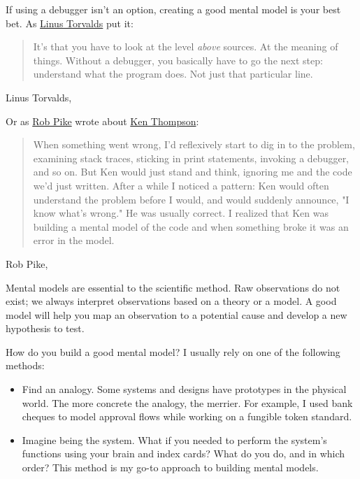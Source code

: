 \documentclass{article}
\begin{document}
If using a debugger isn't an option, creating a good mental model is your best bet.
As \href{https://en.wikipedia.org/wiki/Linus_Torvalds}{Linus Torvalds} put it:
\blockquote{
  It's that you have to look at the level \emph{above} sources.
  At the meaning of things.
  Without a debugger, you basically have to go the next step: understand what the program does.
  Not just that particular line.
}{Linus Torvalds, \href{https://lkml.org/lkml/2000/9/6/65}{\cite{Re: Availability of kdb}}}

Or as \href{https://en.wikipedia.org/wiki/Rob_Pike}{Rob Pike} wrote about \href{https://en.wikipedia.org/wiki/Ken_Thompson}{Ken Thompson}:

\blockquote{
  When something went wrong, I'd reflexively start to dig in to the problem, examining stack traces, sticking in print statements, invoking a debugger, and so on.
  But Ken would just stand and think, ignoring me and the code we'd just written.
  After a while I noticed a pattern: Ken would often understand the problem before I would, and would suddenly announce, "I know what's wrong."
  He was usually correct.
  I realized that Ken was building a mental model of the code and when something broke it was an error in the model.
}{Rob Pike, \href{https://www.informit.com/articles/article.aspx?p=1941206}{\cite{The Best Programming Advice I Ever Got}}}

Mental models are essential to the scientific method.
Raw observations do not exist;
we always interpret observations based on a theory or a model.
A good model will help you map an observation to a potential cause and develop a new hypothesis to test.

How do you build a good mental model?
I usually rely on one of the following methods:
\begin{itemize}
\item Find an analogy.
Some systems and designs have prototypes in the physical world.
The more concrete the analogy, the merrier.
For example, I used bank cheques to model approval flows while working on a fungible token standard.
\item Imagine being the system.
What if you needed to perform the system's functions using your brain and index cards?
What do you do, and in which order?
This method is my go-to approach to building mental models.
\end{itemize}
\end{document}
